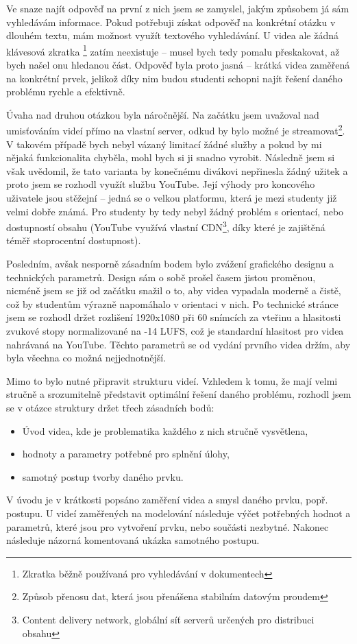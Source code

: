 Ve snaze najít odpověď na první z nich jsem se zamyslel, jakým způsobem já sám vyhledávám informace.
Pokud potřebuji získat odpověď na konkrétní otázku v dlouhém textu, mám možnost využít textového vyhledávání. 
U videa ale žádná klávesová zkratka \footnote{Zkratka běžně používaná pro vyhledávání v dokumentech} zatím neexistuje -- musel bych tedy pomalu přeskakovat, až bych našel onu hledanou část.
Odpověď byla proto jasná -- krátká videa zaměřená na konkrétní prvek, jelikož díky nim budou studenti schopni najít řešení daného problému rychle a efektivně.

Úvaha nad druhou otázkou byla náročnější.
Na začátku jsem uvažoval nad umisťováním videí přímo na vlastní server, odkud by bylo možné je streamovat\footnote{Způsob přenosu dat, která jsou přenášena stabilním datovým proudem}.
V takovém případě bych nebyl vázaný limitací žádné služby a pokud by mi nějaká funkcionalita chyběla, mohl bych si ji snadno vyrobit.
Následně jsem si však uvědomil, že tato varianta by konečnému divákovi nepřinesla žádný užitek a proto jsem se rozhodl využít službu YouTube.
Její výhody pro koncového uživatele jsou stěžejní -- jedná se o velkou platformu, která je mezi studenty již velmi dobře známá.
Pro studenty by tedy nebyl žádný problém s orientací, nebo dostupností obsahu (YouTube využívá vlastní CDN\footnote{Content delivery network, globální síť serverů určených pro distribuci obsahu}, díky které je zajištěná téměř stoprocentní dostupnost).

Posledním, avšak nesporně zásadním bodem bylo zvážení grafického designu a technických parametrů.
Design sám o sobě prošel časem jistou proměnou, nicméně jsem se již od začátku snažil o to, aby videa vypadala moderně a čistě, což by studentům výrazně napomáhalo v orientaci v nich.
Po technické stránce jsem se rozhodl držet rozlišení 1920x1080 při 60 snímcích za vteřinu a hlasitosti zvukové stopy normalizované na -14 LUFS, což je standardní hlasitost pro videa nahrávaná na YouTube.
Těchto parametrů se od vydání prvního videa držím, aby byla všechna co možná nejjednotnější.

Mimo to bylo nutné připravit strukturu videí.
Vzhledem k tomu, že mají velmi stručně a srozumitelně představit optimální řešení daného problému, rozhodl jsem se v otázce struktury držet třech zásadních bodů:
\begin{itemize}[topsep=0pt]
    \setlength\itemsep{0em}
    \item Úvod videa, kde je problematika každého z nich stručně vysvětlena,
    \item hodnoty a parametry potřebné pro splnění úlohy,
    \item samotný postup tvorby daného prvku.
\end{itemize}
V úvodu je v krátkosti popsáno zaměření videa a smysl daného prvku, popř. postupu.
U videí zaměřených na modelování následuje výčet potřebných hodnot a parametrů, které jsou pro vytvoření prvku, nebo součásti nezbytné.
Nakonec následuje názorná komentovaná ukázka samotného postupu.


